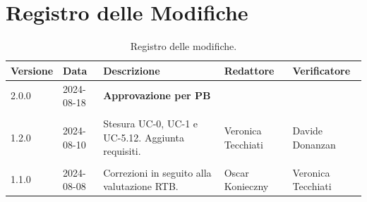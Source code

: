\documentclass[8pt]{article}
\begin{document}
\section*{Registro delle Modifiche}
\begin{table}[ht!]	
	\centering
	\begin{tabular}{p{1.2cm} p{2cm} p{5cm} p{3cm} p{3cm}}
		\toprule
		\textbf{Versione}& \textbf{Data} & \textbf{Descrizione} & \textbf{Redattore} & \textbf{Verificatore} \\
		\midrule
            2.0.0 & 2024-08-18 & \textbf{Approvazione per PB} & &  \\\\
            1.2.0 & 2024-08-10 & Stesura UC-0, UC-1 e UC-5.12. Aggiunta requisiti. & Veronica Tecchiati & Davide Donanzan \\\\
			1.1.0 & 2024-08-08 & Correzioni in seguito alla valutazione RTB. & Oscar Konieczny & Veronica Tecchiati
 		    \\ %
		\bottomrule
	\end{tabular}
	\caption{Registro delle modifiche.}
	\label{table:Registro delle modifiche}
\end{table}
\clearpage
\end{document}
